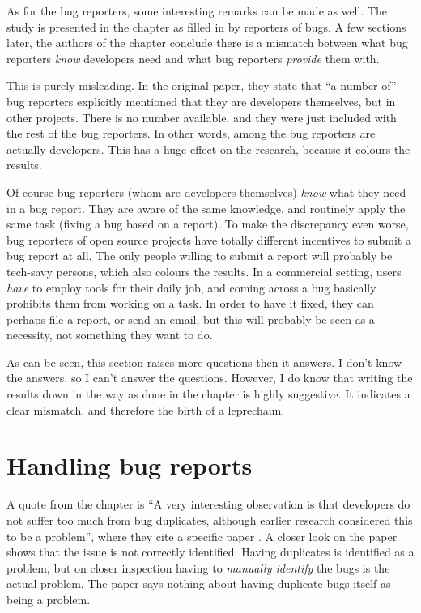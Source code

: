 As for the bug reporters, some interesting remarks can be made as well. 
The study is presented in the chapter as filled in by reporters of bugs. 
A few sections later, the authors of the chapter conclude there is a mismatch between what bug reporters \emph{know} developers need and what bug reporters \emph{provide} them with. 

This is purely misleading.
In the original paper, they state that ``a number of'' bug reporters explicitly mentioned that they are developers themselves, but in other projects. 
There is no number available, and they were just included with the rest of the bug reporters. 
In other words, among the bug reporters are actually developers. 
This has a huge effect on the research, because it colours the results. 

Of course bug reporters (whom are developers themselves) \emph{know} what they need in a bug report. 
They are aware of the same knowledge, and routinely apply the same task (fixing a bug based on a report). 
To make the discrepancy even worse, bug reporters of open source projects have totally different incentives to submit a bug report at all. 
The only people willing to submit a report will probably be tech-savy persons, which also colours the results.
In a commercial setting, users \emph{have} to employ tools for their daily job, and coming across a bug basically prohibits them from working on a task. 
In order to have it fixed, they can perhaps file a report, or send an email, but this will probably be seen as a necessity, not something they want to do. 

As can be seen, this section raises more questions then it answers.
I don't know the answers, so I can't answer the questions. 
However, I do know that writing the results down in the way as done in the chapter is highly suggestive. 
It indicates a clear mismatch, and therefore the birth of a leprechaun.

\section{Handling bug reports}
A quote from the chapter is ``A very interesting observation is that developers do not suffer too much from bug duplicates, although earlier research considered this to be a problem'', where they cite a specific paper \cite{Anvik:2005:COB:1117696.1117704}.
A closer look on the paper shows that the issue is not correctly identified.
Having duplicates is identified as a problem, but on closer inspection having to \emph{manually identify} the bugs is the actual problem. 
The paper says nothing about having duplicate bugs itself as being a problem. 

